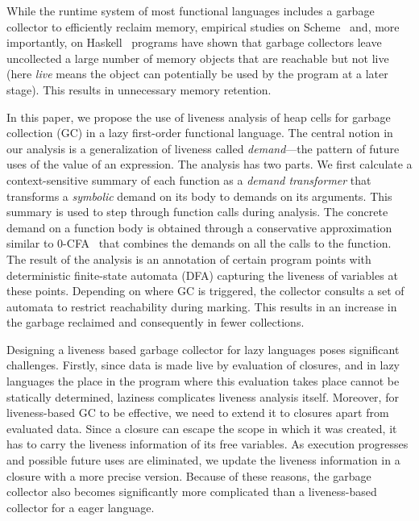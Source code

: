 \documentclass[9pt]{sigplanconf}
\newcommand{\added}[1]{#1}
\newcommand{\todelete}[1]{}%
\begin{document}
While  the runtime  system  of most  functional  languages includes  a
garbage collector to efficiently  reclaim memory, empirical studies on
Scheme~\cite{karkare06effectiveness}   and,   more   importantly,   on
Haskell~\cite{rojemo96lag} programs have shown that garbage collectors
leave uncollected a large number  of memory objects that are reachable
but not live (here {\em live} means the object can potentially be used
by the program at a  later stage).  This results in unnecessary memory
retention.

In this paper,  we propose the use of liveness  analysis of heap cells
for garbage collection (GC) in a lazy first-order functional language.  The
central notion in our analysis  is a generalization of liveness called
{\em  demand}---the  pattern  of  future  uses  of  the  value  of  an
expression.   The  analysis  has  two parts.   We  first  calculate  a
context-sensitive  summary   of  each   function  as  a   {\em  demand
  transformer} that transforms a {\em  symbolic} demand on its body to
demands  on its  arguments.   This  summary is  used  to step  through
function calls  during analysis.   The concrete  demand on  a function
body  is  obtained through  a  conservative  approximation similar  to
0-CFA~\cite{Shivers:1988} that  combines the demands on  all the calls
to  the function.   The result  of the  analysis is  an annotation  of
certain program points with  deterministic finite-state automata (DFA)
capturing the  liveness of  variables at  these points.   Depending on
where GC is triggered, the collector consults a set of
automata to restrict reachability during  marking.  This results in an
increase in  the garbage reclaimed  and consequently in  fewer 
collections.


\todelete{While  this  idea has  been  shown  to  be effective  for  a
  first-order     {\em     eager}    language~\cite{asati14lgc},     a
  straightforward extension of the technique  is not possible for lazy
  languages,  where   heap-allocated  objects  may   include  closures
  (runtime   representations    of   unevaluated    expressions).    }
\added{Designing a liveness based garbage collector for lazy languages
  poses significant challenges.}  Firstly, since  data is made live by
evaluation of closures, and in lazy languages the place in the program
where  this evaluation  takes place  cannot be  statically determined,
laziness   complicates  liveness   analysis  itself.    Moreover,  for
liveness-based GC  to be effective, we  need to extend
it to closures apart from evaluated  data.  Since a closure can escape
the  scope in  which it  was  created, it  has to  carry the  liveness
information  of  its  free  variables.  As  execution  progresses  and
possible  future   uses  are   eliminated,  we  update   the  liveness
information  in a  closure with  a more  precise version.   Because of
these reasons,  the garbage collector also  becomes significantly more
complicated than a liveness-based collector for a eager language.
\end{document}
